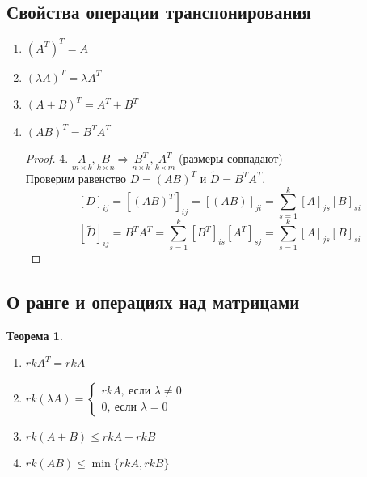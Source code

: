 \documentclass[a4paper, 12pt]{article}
\newcommand\tab[1][.5cm]{\hspace*{#1}}
\theoremstyle{definition}
\newtheorem*{theorem}{Теорема}
\begin{document}
  \subsection{Свойства операции транспонирования}
  \begin{enumerate}
    \item $(A^T)^T = A$
    \item $(\lambda A)^T = \lambda A^T$
    \item $(A+B)^T = A^T + B^T$
    \item $(AB)^T = B^TA^T$   
    \begin{proof}
      4. $\underset{m \times k}{A}, \underset{k \times n}{B} \Longrightarrow \underset{n \times k}{B^T}, \underset{k \times m}{A^T}$ (размеры совпадают) \\
      Проверим равенство $D = (AB)^T \text{ и } \widetilde{D} = B^TA^T$.
      $$[D]_{ij} = [(AB)^T]_{ij} = [(AB)]_{ji} = \sum \limits_{s=1}^k[A]_{js}[B]_{si}$$ 
      $$[\widetilde{D}]_{ij} = B^TA^T = \sum \limits_{s=1}^k[B^T]_{is}[A^T]_{sj} = \sum \limits_{s=1}^k[A]_{js}[B]_{si}$$ 
    \end{proof} 
  \end{enumerate}
  \subsection{О ранге и операциях над матрицами}
  \begin{theorem} \tab
    \begin{enumerate}
      \item $rkA^T = rkA$
      \item $rk(\lambda A) = \begin{cases}
        rkA, \ \text{если } \lambda \neq 0 \\
        0, \ \text{если } \lambda = 0
      \end{cases}
      $ 
      \item $rk(A+B) \leq rkA + rkB$ 
      \item $rk(AB) \leq \min\{rkA, rkB\}$ 
    \end{enumerate}
  \end{theorem}  
    
\end{document}
